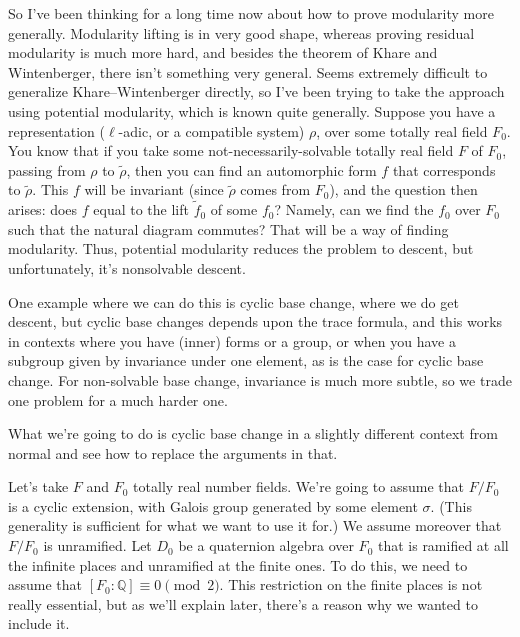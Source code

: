 \documentclass[reqno]{amsart} 
\begin{document}
So I've been thinking for a long time now about how to prove modularity more generally.  Modularity lifting is in very good shape, whereas proving residual modularity is much more hard, and besides the theorem of Khare and Wintenberger, there isn't something very general.  Seems extremely difficult to generalize Khare--Wintenberger directly, so I've been trying to take the approach using potential modularity, which is known quite generally.  Suppose you have a representation ($\ell$-adic, or a compatible system) $\rho$, over some totally real field $F_0$.  You know that if you take some not-necessarily-solvable totally real field $F$ of $F_0$, passing from $\rho$ to $\tilde{\rho}$, then you can find an automorphic form $f$ that corresponds to $\tilde{\rho}$.  This $f$ will be invariant (since $\tilde{\rho}$ comes from $F_0$), and the question then arises: does $f$ equal to the lift $\tilde{f}_0$ of some $f_0$?  Namely, can we find the $f_0$ over $F_0$ such that the natural diagram commutes?  That will be a way of finding modularity.  Thus, potential modularity reduces the problem to descent, but unfortunately, it's nonsolvable descent.

One example where we can do this is cyclic base change, where we do get descent, but cyclic base changes depends upon the trace formula, and this works in contexts where you have (inner) forms or a group, or when you have a subgroup given by invariance under one element, as is the case for cyclic base change.  For non-solvable base change, invariance is much more subtle, so we trade one problem for a much harder one.

What we're going to do is cyclic base change in a slightly different context from normal and see how to replace the arguments in that.

Let's take $F$ and $F_0$ totally real number fields.  We're going  to assume that $F / F_0$ is a cyclic extension, with Galois group generated by some element $\sigma$.  (This generality is sufficient for what we want to use it for.)  We assume moreover that $F / F_0$ is unramified.  Let $D_0$ be a quaternion algebra over $F_0$ that is ramified at all the infinite places and unramified at the finite ones.  To do this, we need to assume that $[F_0 : \mathbb{Q}] \equiv 0 \pmod{2}$.  This restriction on the finite places is not really essential, but as we'll explain later, there's a reason why we wanted to include it.
\end{document}

